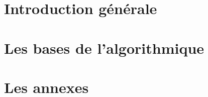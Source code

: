 \documentclass[a4paper,doubleside,11pt]{book}
\begin{document}

	
	
	

	\part{Introduction générale}	
		
		
		

	\part{Les bases de l'algorithmique}
		
		

			


	
	\part{Les annexes}
		
	
\end{document}
